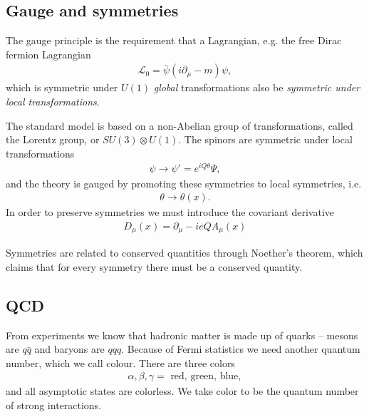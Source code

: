 \documentclass[11pt]{article}
\begin{document}
\begin{multicols}{2}
\subsection*{Gauge and symmetries}

\begin{flushleft}
The gauge principle is the requirement that a Lagrangian, e.g. the free Dirac fermion Lagrangian
\begin{align*}
\mathcal{L}_0 = \bar{\psi}(i \partial_{\mu} - m) \psi,
\end{align*}
which is symmetric under $U(1)$ \textit{global} transformations also be \textit{symmetric under local transformations}.
\end{flushleft}

\begin{flushleft}
The standard model is based on a non-Abelian group of transformations, called the Lorentz group, or $SU(3) \otimes U(1)$. The spinors are symmetric under local transformations
\begin{align*}
\psi \rightarrow \psi'=e^{iQ\theta} \Psi,
\end{align*}
and the theory is gauged by promoting these symmetries to local symmetries, i.e.
\begin{align*}
\theta \rightarrow \theta (x).
\end{align*}
In order to preserve symmetries we must introduce the covariant derivative
\begin{align}
D_{\mu}(x) = \partial_{\mu} - ieQA_{\mu}(x)
\end{align}
\end{flushleft}

\begin{flushleft}
Symmetries are related to conserved quantities through Noether's theorem, which claims that for every symmetry there must be a conserved quantity.
\end{flushleft}



\subsection{QCD}
\begin{flushleft}
From experiments we know that hadronic matter is made up of quarks -- mesons are $q \bar{q}$ and baryons are $qqq$. Because of Fermi statistics we need another quantum number, which we call colour. There are three colors
\begin{align*}
\alpha, \beta, \gamma = \text{ red, green, blue},
\end{align*}
and all asymptotic states are colorless. We take color to be the quantum number of strong interactions.
\end{flushleft}


\end{multicols}
\end{document}
